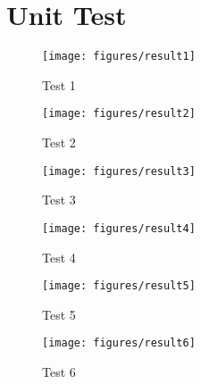 \setcounter{secnumdepth}{1}
\section{Unit Test}

\vspace{-0.5cm}
\begin{figure}[htp!]
	\begin{center}
		\texttt{[image: figures/result1]}
		\caption{Test 1}
		\label{fig:test1}
	\end{center}
\end{figure}

\vspace{-0.5cm}
\begin{figure}[htp!]
	\begin{center}
		\texttt{[image: figures/result2]}
		\caption{Test 2}
		\label{fig:test2}
	\end{center}
\end{figure}

\vspace{-0.5cm}
\begin{figure}[htp!]
	\begin{center}
		\texttt{[image: figures/result3]}
		\caption{Test 3}
		\label{fig:test3}
	\end{center}
\end{figure}

\vspace{-0.5cm}
\begin{figure}[htp!]
	\begin{center}
		\texttt{[image: figures/result4]}
		\caption{Test 4}
		\label{fig:test4}
	\end{center}
\end{figure}

\vspace{-0.5cm}
\begin{figure}[htp!]
	\begin{center}
		\texttt{[image: figures/result5]}
		\caption{Test 5}
		\label{fig:test5}
	\end{center}
\end{figure}

\vspace{-0.5cm}
\begin{figure}[htp!]
	\begin{center}
		\texttt{[image: figures/result6]}
		\caption{Test 6}
		\label{fig:test6}
	\end{center}
\end{figure}

